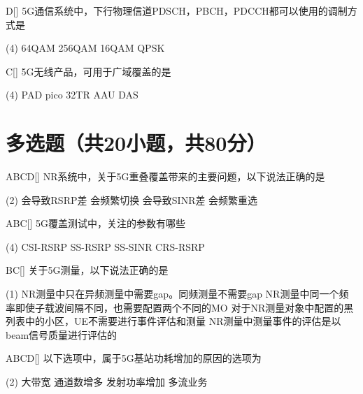 \begin{choice}{D}[]
    5G通信系统中，下行物理信道PDSCH，PBCH，PDCCH都可以使用的调制方式是
    \begin{tasks}(4)
        \task 64QAM
        \task 256QAM
        \task 16QAM
        \task QPSK
    \end{tasks}
\end{choice}


\begin{choice}{C}[]
    5G无线产品，可用于广域覆盖的是
    \begin{tasks}(4)
        \task PAD
        \task pico
        \task 32TR AAU
        \task DAS
    \end{tasks}
\end{choice}

\section{多选题（共20小题，共80分）}

\begin{choice}{\;ABCD\;}[]
    NR系统中，关于5G重叠覆盖带来的主要问题，以下说法正确的是
    \begin{tasks}(2)
        \task 会导致RSRP差
        \task 会频繁切换
        \task 会导致SINR差
        \task 会频繁重选
    \end{tasks}
\end{choice}

\begin{choice}{\;ABC\;}[]
    5G覆盖测试中，关注的参数有哪些
    \begin{tasks}(4)
        \task CSI-RSRP
        \task SS-RSRP
        \task SS-SINR
        \task CRS-RSRP
    \end{tasks}
\end{choice}

\begin{choice}{\;BC\;}[]
    关于5G测量，以下说法正确的是
    \begin{tasks}(1)
        \task NR测量中只在异频测量中需要gap。同频测量不需要gap
        \task NR测量中同一个频率即使子载波间隔不同，也需要配置两个不同的MO
        \task 对于NR测量对象中配置的黑列表中的小区，UE不需要进行事件评估和测量
        \task NR测量中测量事件的评估是以beam信号质量进行评估的
    \end{tasks}
\end{choice}

\begin{choice}{\;ABCD\;}[]
    以下选项中，属于5G基站功耗增加的原因的选项为
    \begin{tasks}(2)
        \task 大带宽
        \task 通道数增多
        \task 发射功率增加
        \task 多流业务
    \end{tasks}
\end{choice}


